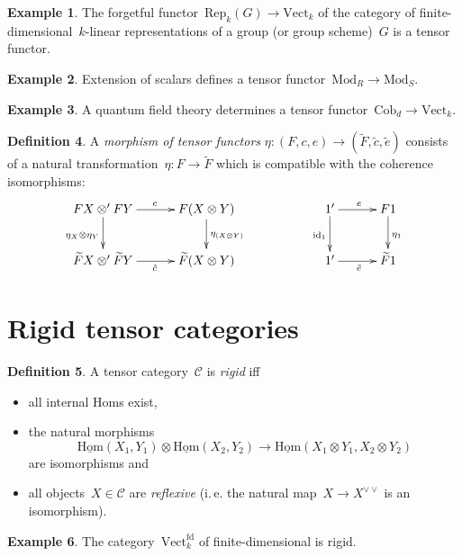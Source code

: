 \documentclass[a4paper,english,12pt]{scrartcl}
\theoremstyle{definition}
\newtheorem{defn}{Definition}[section]
\newtheorem{ex}[defn]{Example}
\theoremstyle{plain}
\theoremstyle{remark}
\newcommand{\C}{\mathcal{C}}
\newcommand{\id}{\mathrm{id}}
\renewcommand{\_}{\mathpunct{.}\,}
\newcommand{\?}{\,{:}\,}
\newcommand{\Mod}{\mathrm{Mod}}
\newcommand{\Vect}{\mathrm{Vect}}
\newcommand{\Hom}{\underline{\mathrm{Hom}}}
\newcommand{\Rep}{\mathrm{Rep}}
\newcommand{\Cob}{\mathrm{Cob}}
\begin{document}
\begin{ex}The forgetful functor~$\Rep_k(G) \to \Vect_k$ of the category
of finite-dimensional~$k$-linear representations of a group (or group
scheme)~$G$ is a tensor functor.\end{ex}

\begin{ex}Extension of scalars defines a tensor functor~$\Mod_R \to
\Mod_S$.\end{ex}

\begin{ex}A quantum field theory determines a tensor functor~$\Cob_d \to
\Vect_k$.\end{ex}

\begin{defn}A \emph{morphism of tensor functors} $\eta : (F,c,e) \to
(\widetilde F,\tilde c,\tilde e)$ consists of a natural transformation~$\eta : F \to
\widetilde F$ which is compatible with the coherence isomorphisms:
\[ \xymatrixcolsep{2.5pc}\xymatrix{
  FX \otimes' FY \ar[d]_{\eta_X \otimes \eta_Y} \ar[r]^c &
  F(X \otimes Y) \ar[d]^{\eta_{(X \otimes Y)}} &&
  1' \ar[r]^e \ar[d]_{\id_1} & F1 \ar[d]^{\eta_1} \\
  \widetilde F X \otimes' \widetilde F Y \ar[r]_{\tilde c} &
  \widetilde F(X \otimes Y) &&
  1' \ar[r]_{\tilde e} & \widetilde F1
} \]
\end{defn}


\section{Rigid tensor categories}

\begin{defn}A tensor category~$\C$ is \emph{rigid} iff
\begin{itemize}
\item all internal Homs exist,
\item the natural morphisms
\[ \Hom(X_1,Y_1) \otimes \Hom(X_2,Y_2) \longrightarrow
  \Hom(X_1 \otimes Y_1, X_2 \otimes Y_2) \]
are isomorphisms and
\item all objects~$X \in \C$ are \emph{reflexive} (i.\,e. the natural map~$X
\to X^{\vee\vee}$ is an isomorphism).
\end{itemize}
\end{defn}

\begin{ex}The category~$\Vect^\mathrm{fd}_k$ of finite-dimensional is
rigid.\end{ex}
\end{document}
